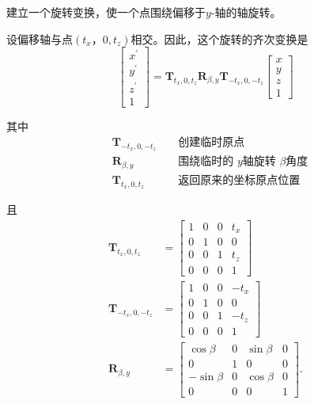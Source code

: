 \begin{example}
    建立一个旋转变换，使一个点围绕偏移于$y$-轴的轴旋转。
    
    设偏移轴与点$\left(t_{x}， 0, t_{z}\right)$相交。因此，这个旋转的齐次变换是
    $$
    \left[\begin{array}{c}
    x^{\prime} \\
    y^{\prime} \\
    z^{\prime} \\
    1
    \end{array}\right]=\mathbf{T}_{t_{x}, 0, t_{z}} \mathbf{R}_{\beta, y} \mathbf{T}_{-t_{x}, 0,-t_{z}}\left[\begin{array}{c}
    x \\
    y \\
    z \\
    1
    \end{array}\right]
    $$
    
    其中
    $$
    \begin{aligned}
    & \mathbf{T}_{-t_{x}, 0,-t_{z}} && \text { 创建临时原点 } \\
    & \mathbf{R}_{\beta, y} && \text { 围绕临时的 } y \text {轴旋转 }\beta \text{角度} \\
    & \mathbf{T}_{t_{x}, 0, t_{z}} && \text { 返回原来的坐标原点位置 }
    \end{aligned}
    $$
    
    且
    $$
    \begin{aligned}
    \mathbf{T}_{t_{x}, 0, t_{z}} & =\left[\begin{array}{llll}
    1 & 0 & 0 & t_{x} \\
    0 & 1 & 0 & 0 \\
    0 & 0 & 1 & t_{z} \\
    0 & 0 & 0 & 1
    \end{array}\right] \\
    \mathbf{T}_{-t_{x}, 0,-t_{z}} & =\left[\begin{array}{cccc}
    1 & 0 & 0 & -t_{x} \\
    0 & 1 & 0 & 0 \\
    0 & 0 & 1 & -t_{z} \\
    0 & 0 & 0 & 1
    \end{array}\right] \\
    \mathbf{R}_{\beta, y} & =\left[\begin{array}{cccc}
    \cos \beta & 0 & \sin \beta & 0 \\
    0 & 1 & 0 & 0 \\
    -\sin \beta & 0 & \cos \beta & 0 \\
    0 & 0 & 0 & 1
    \end{array}\right] .
    \end{aligned}
    $$
    

\end{example}
